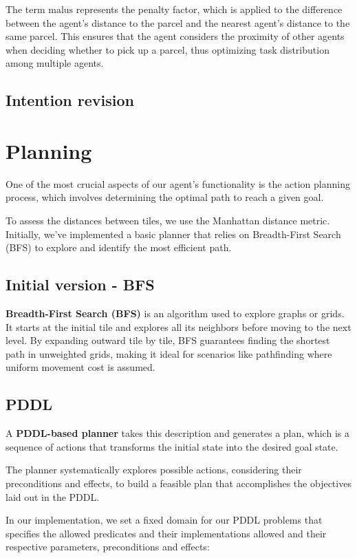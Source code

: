 \documentclass[10pt]{article}
\begin{document}
The term $\text{malus}$ represents the penalty factor, which is applied to the difference between the agent's distance to the parcel and the nearest agent's distance to the same parcel. This ensures that the agent considers the proximity of other agents when deciding whether to pick up a parcel, thus optimizing task distribution among multiple agents.

\subsection{Intention revision}

\section{Planning}

One of the most crucial aspects of our agent's functionality is the action planning process, which involves determining the optimal path to reach a given goal. 

To assess the distances between tiles, we use the Manhattan distance metric. Initially, we've implemented a basic planner that relies on Breadth-First Search (BFS) to explore and identify the most efficient path.

\subsection{Initial version - BFS}

\textbf{Breadth-First Search (BFS)} is an algorithm used to explore graphs or grids. It starts at the initial tile and explores all its neighbors before moving to the next level. By expanding outward tile by tile, BFS guarantees finding the shortest path in unweighted grids, making it ideal for scenarios like pathfinding where uniform movement cost is assumed.

\subsection{PDDL}

A \textbf{PDDL-based planner} takes this description and generates a plan, which is a sequence of actions that transforms the initial state into the desired goal state. 

The planner systematically explores possible actions, considering their preconditions and effects, to build a feasible plan that accomplishes the objectives laid out in the PDDL.

In our implementation, we set a fixed domain for our PDDL problems that specifies the allowed predicates and their implementations allowed and their respective parameters, preconditions and effects:
\end{document}
